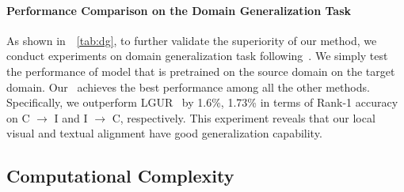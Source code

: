 \paragraph{Performance Comparison on the Domain Generalization Task}
As shown in~\tablename~\ref{tab:dg}, to further validate the superiority of our method, we conduct experiments on domain generalization task following~\cite{lgur}. We simply test the performance of model that is pretrained on the source domain on the target domain. Our \ourmodel~achieves the best performance among all the other methods. Specifically, we outperform LGUR~\cite{lgur} by 1.6\%, 1.73\% in terms of Rank-1 accuracy on C $\rightarrow$ I and I $\rightarrow$ C, respectively.
This experiment reveals that our local visual and textual alignment have good generalization capability.


\begin{table}[t!]
\renewcommand\arraystretch{1.06}
\centering
\caption{\small{Computational cost comparison among state-of-the-art methods on the CUHK-PEDES database. ``CAM'' represents the cross-modal attention mechanism.}}
\label{tab:costtime}
\end{table}


\subsection{Computational Complexity}

